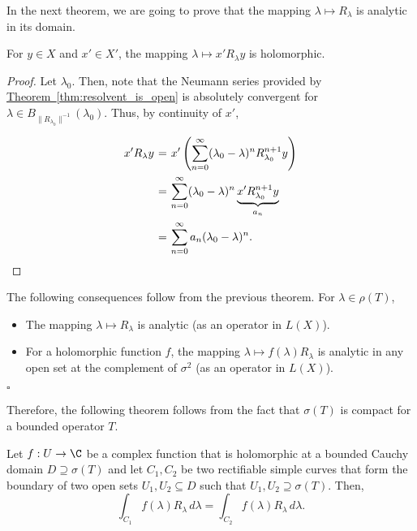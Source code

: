 In the next theorem, we are going to prove that the mapping $\lambda \mapsto R_\lambda$ is analytic in its domain.

\begin{theorem}
    For $y\in X$ and $x' \in X'$, the mapping $\lambda \mapsto x'R_{\lambda}y$ is holomorphic.
\end{theorem}

\begin{proof}
    Let $\lambda_0$. Then, note that the Neumann series provided by \hyperref[thm:resolvent_is_open]{Theorem~\ref*{thm:resolvent_is_open}} is absolutely convergent for $\lambda \in B_{\|R_{\lambda_0}\|^{-1}}(\lambda_0)$. Thus, by continuity of $x'$,
    \[ \everymath{\displaystyle}
    \arraycolsep=1.8pt\def\arraystretch{2.5}
    \begin{array}{rcl}
        x'R_{\lambda}y & = & x'\left( \sum_{n = 0}^{\infty} (\lambda_0-\lambda)^n R_{\lambda_0}^{n+1} y \right)\\
        & = & \sum_{n = 0}^{\infty} (\lambda_0-\lambda)^{n} \underbrace{x' R_{\lambda_0}^{n+1}y}_{a_n}\\
        & = & \sum_{n = 0}^{\infty} a_n (\lambda_0-\lambda)^{n}.
    \end{array} \]
\end{proof}

\begin{corollary}\label{cor:resolvent_analytic} The following consequences follow from the previous theorem. For $\lambda \in \rho(T)$,
    \begin{itemize}
        \item  The mapping $\lambda \mapsto R_{\lambda}$ is analytic (as an operator in $L(X)$).
        \item  For a holomorphic function $f$, the mapping $\lambda \mapsto f(\lambda)R_{\lambda}$ is analytic in any open set at the complement of $\sigma^2$ (as an operator in $L(X)$).
    \end{itemize}
    \hfill $\square$
\end{corollary}

Therefore, the following theorem follows from the fact that $\sigma(T)$ is compact for a bounded operator $T$.

\begin{theorem}\label{thm:cauchy_integral_well_defined}
    Let $f: U \to \C$ be a complex function that is holomorphic at a bounded Cauchy domain $D \supseteq \sigma(T)$ and let $C_1,C_2$ be two rectifiable simple curves that form the boundary of two open sets $U_1, U_2 \subseteq D$ such that $U_1, U_2 \supseteq \sigma(T)$. Then,
    \[ \int_{C_1} f(\lambda) R_\lambda\, d\lambda = \int_{C_2} f(\lambda) R_\lambda\, d\lambda. \]
\end{theorem}

